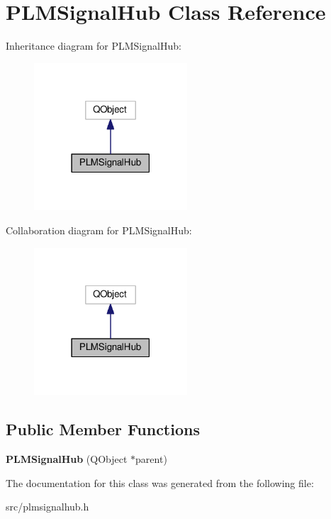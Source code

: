\hypertarget{class_p_l_m_signal_hub}{}\section{P\+L\+M\+Signal\+Hub Class Reference}
\label{class_p_l_m_signal_hub}


Inheritance diagram for P\+L\+M\+Signal\+Hub\+:\nopagebreak
\begin{figure}[H]
\begin{center}
\leavevmode
\includegraphics[width=162pt]{class_p_l_m_signal_hub__inherit__graph}
\end{center}
\end{figure}


Collaboration diagram for P\+L\+M\+Signal\+Hub\+:\nopagebreak
\begin{figure}[H]
\begin{center}
\leavevmode
\includegraphics[width=162pt]{class_p_l_m_signal_hub__coll__graph}
\end{center}
\end{figure}
\subsection*{Public Member Functions}
\begin{DoxyCompactItemize}
\item 
{\bfseries P\+L\+M\+Signal\+Hub} (Q\+Object $\ast$parent)\hypertarget{class_p_l_m_signal_hub_adafe7723e20aa1621654cb59b42591a9}{}\label{class_p_l_m_signal_hub_adafe7723e20aa1621654cb59b42591a9}

\end{DoxyCompactItemize}


The documentation for this class was generated from the following file\+:\begin{DoxyCompactItemize}
\item 
src/plmsignalhub.\+h\end{DoxyCompactItemize}
